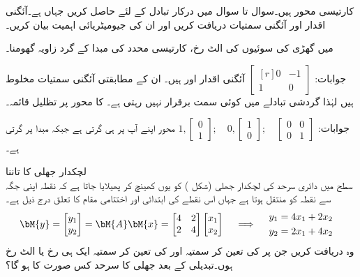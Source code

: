  کارتیسی محور ہیں۔سوال  تا سوال   میں درکار تبادل  کے لئے  حاصل کریں جہاں  ہے۔آئگنی اقدار اور آئگنی سمتیات دریافت کریں اور ان کی جیومیٹریائی اہمیت بیان کریں۔


 میں گھڑی کی سوئیوں کی الٹ رخ، کارتیسی محدد کی مبدا کے گرد   زاویہ گھومنا۔

جوابات:
$\begin{bmatrix*}[r] 0&-1\\1&0  \end{bmatrix*}$
آئگنی اقدار  اور   ہیں۔ ان کے مطابقتی آئگنی سمتیات مخلوط ہیں لہٰذا گردشی تبادلے میں کوئی سمت برقرار نہیں رہتی ہے۔
 کا  محور پر تظلیل قائمہ۔

جوابات:
$1,\begin{bmatrix} 0\\1 \end{bmatrix}; \quad 0,\begin{bmatrix} 1\\0 \end{bmatrix};\quad \begin{bmatrix}0&0\\0&1  \end{bmatrix}$
محور  اپنے آپ پر ہی گرتی ہے جبکہ  مبدا پر گرتی ہے۔


\quad لچکدار جھلی کا تاننا\\
 سطح میں دائری سرحد  کی لچکدار جھلی (شکل ) کو یوں کھینچ کر پھیلایا جاتا ہے کہ نقطہ  اپنی جگہ سے  نقطہ   کو منتقل ہوتا ہے جہاں اس نقطے کی ابتدائی اور اختتامی  مقام کا تعلق درج ذیل ہے۔
\begin{gather*}
\bM{y}=\begin{bmatrix} y_1\\y_2 \end{bmatrix}=\bM{A}\bM{x}=\begin{bmatrix}4&2\\2&4  \end{bmatrix}\begin{bmatrix} x_1\\x_2 \end{bmatrix}\quad \implies \quad \begin{aligned}y_1&=4x_1+2x_2\\y_2&=2x_1+4x_2&  \end{aligned}
\end{gather*}
وہ  دریافت کریں جن پر  کی تعین کر سمتیہ اور  کی تعین کر سمتیہ ایک ہی رخ یا الٹ رخ ہوں۔تبدیلی کے بعد جھلی کا سرحد کس صورت کا ہو گا؟

